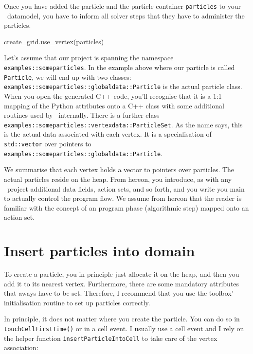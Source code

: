 \noindent
Once you have added the particle and the particle container \texttt{particles}
to your \Peano\ datamodel, you have to inform all solver steps that they have to
administer the particles.

\begin{code}
create_grid.use_vertex(particles)
\end{code}

\noindent
Let's assume that our project is spanning the namespace
\texttt{examples::someparticles}.
 In the example above where our particle is
called \texttt{Particle}, we will end up with two classes:
\linebreak
\texttt{examples::someparticles::globaldata::Particle} is the actual particle
class. 
When you open the generated C++ code, you'll recognise that it is a 1:1 mapping
of the Python attributes onto a C++ class with some additional routines used by
\Peano\ internally.
There is a further class
\texttt{examples::someparticles::vertexdata::ParticleSet}.
As the name says, this is the actual data associated with each vertex.
It is a specialisation of \texttt{std::vector} over pointers to
\texttt{examples::someparticles::globaldata::Particle}.

We summarise that each vertex holds a vector to pointers over particles.
The actual particles reside on the heap.
From hereon, you introduce, as with any \Peano\ project additional data fields,
action sets, and so forth, and you write you main to actually control the
program flow.
We assume from hereon that the reader is familiar with the concept of an
program phase (algorithmic step) mapped onto an action set.



\section{Insert particles into domain}

To create a particle, you in principle just allocate it on the heap, and then
you add it to its nearest vertex.
Furthermore, there are some mandatory attributes that aways have to be set. 
Therefore, I recommend that you use the toolbox' initialisation routine to set
up particles correctly.


In principle, it does not matter where you create the particle.
You can do so in \texttt{touchCellFirstTime()} or in a cell event. 
I usually use a cell event and I rely on the helper function
\texttt{insertParticleIntoCell} to take care of the vertex association:


